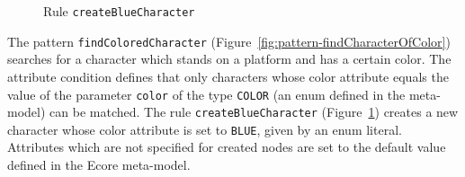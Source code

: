 \begin{figure}[h!]
	\centering
	\quad
	\caption{Rule \texttt{createBlueCharacter}}
	\label{fig:rule-createBlueCharacter}
\end{figure}

\noindent
The pattern \texttt{findColoredCharacter} (Figure~\ref{fig:pattern-findCharacterOfColor}) searches for a character which stands on a platform and has a certain color.
The attribute condition defines that only characters whose color attribute equals the value of the parameter \texttt{color} of the type \texttt{COLOR} (an enum defined in the meta-model) can be matched.
The rule \texttt{createBlueCharacter} (Figure~\ref{fig:rule-createBlueCharacter}) creates a new character whose color attribute is set to \texttt{BLUE}, given by an enum literal.
Attributes which are not specified for created nodes are set to the default value defined in the Ecore meta-model.

